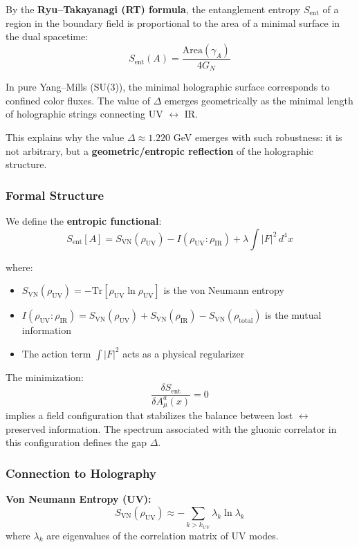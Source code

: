 \documentclass[11pt]{article}
\theoremstyle{definition}
\theoremstyle{remark}
\begin{document}
By the \textbf{Ryu--Takayanagi (RT) formula}, the entanglement entropy $S_{\text{ent}}$ of a region in the boundary field is proportional to the area of a minimal surface in the dual spacetime:
\[
S_{\text{ent}}(A) = \frac{\text{Area}(\gamma_A)}{4G_N}
\]

In pure Yang--Mills (SU(3)), the minimal holographic surface corresponds to confined color fluxes. The value of $\Delta$ emerges geometrically as the minimal length of holographic strings connecting UV $\leftrightarrow$ IR.

This explains why the value $\Delta \approx 1.220$ GeV emerges with such robustness: it is not arbitrary, but a \textbf{geometric/entropic reflection} of the holographic structure.

\subsubsection{Formal Structure}

We define the \textbf{entropic functional}:
\[
S_{\text{ent}}[A] = S_{\text{VN}}(\rho_{\text{UV}}) - I(\rho_{\text{UV}} : \rho_{\text{IR}}) + \lambda \int |F|^2 \, d^4x
\]

where:
\begin{itemize}
\item $S_{\text{VN}}(\rho_{\text{UV}}) = -\text{Tr}[\rho_{\text{UV}} \ln \rho_{\text{UV}}]$ is the von Neumann entropy
\item $I(\rho_{\text{UV}} : \rho_{\text{IR}}) = S_{\text{VN}}(\rho_{\text{UV}}) + S_{\text{VN}}(\rho_{\text{IR}}) - S_{\text{VN}}(\rho_{\text{total}})$ is the mutual information
\item The action term $\int |F|^2$ acts as a physical regularizer
\end{itemize}

The minimization:
\[
\frac{\delta S_{\text{ent}}}{\delta A_\mu^a(x)} = 0
\]
implies a field configuration that stabilizes the balance between lost $\leftrightarrow$ preserved information. The spectrum associated with the gluonic correlator in this configuration defines the gap $\Delta$.

\subsubsection{Connection to Holography}

\textbf{Von Neumann Entropy (UV):}
\[
S_{\text{VN}}(\rho_{\text{UV}}) \approx -\sum_{k > k_{\text{UV}}} \lambda_k \ln \lambda_k
\]
where $\lambda_k$ are eigenvalues of the correlation matrix of UV modes.
\end{document}
